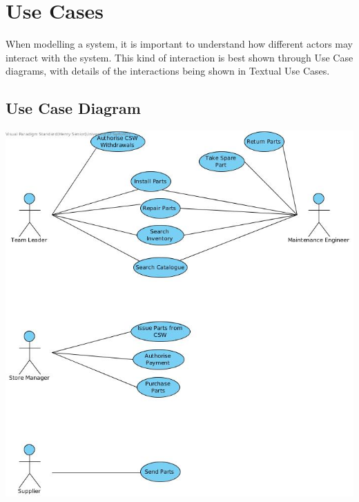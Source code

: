 \section{Use Cases}
When modelling a system, it is important to understand how different actors may interact with the system. This kind of interaction is best shown through Use Case diagrams, with details of the interactions being shown in Textual Use Cases.

\subsection{Use Case Diagram}
\begin{center}
	\includegraphics[width=\textwidth]{images/Use-Case.jpg}
\end{center}

\newpage


